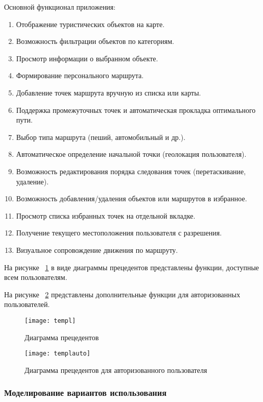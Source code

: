 Основной функционал приложения:
\begin{enumerate}
	\item Отображение туристических объектов на карте.
	\item Возможность фильтрации объектов по категориям.
	\item Просмотр информации о выбранном объекте.
	\item Формирование персонального маршрута.
	\item Добавление точек маршрута вручную из списка или карты.
	\item Поддержка промежуточных точек и автоматическая прокладка оптимального пути.
	\item Выбор типа маршрута (пеший, автомобильный и др.).
	\item Автоматическое определение начальной точки (геолокация пользователя).
	\item Возможность редактирования порядка следования точек (перетаскивание, удаление).
	\item Возможность добавления/удаления объектов или маршрутов в избранное.
	\item Просмотр списка избранных точек на отдельной вкладке.
	\item Получение текущего местоположения пользователя с разрешения.
	\item Визуальное сопровождение движения по маршруту.
\end{enumerate}

На рисунке ~\ref{templ:image} в виде диаграммы прецедентов представлены функции, доступные всем пользователям.

На рисунке ~\ref{templauto:image} представлены дополнительные функции для авторизованных пользователей.

\begin{figure}[ht]
	\texttt{[image: templ]}
	\caption{Диаграмма прецедентов}
	\label{templ:image}
\end{figure}

\vspace{+100mm}
\begin{figure}[ht]
	\texttt{[image: templauto]}
	\caption{Диаграмма прецедентов для авторизованного пользователя}
	\label{templauto:image}
\end{figure}

\subsubsection{Моделирование вариантов использования}
